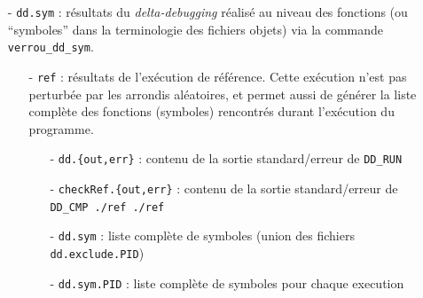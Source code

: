 \documentclass[a4paper]{article}
\begin{document}
\begin{itemize}
\item[- \tt dd.sym] : résultats du \textit{delta-debugging} réalisé
  au niveau des fonctions (ou ``symboles'' dans la terminologie des fichiers
  objets) via la commande \texttt{verrou\_dd\_sym}.
  \begin{itemize}
  \item[- \tt ref] : résultats de l'exécution de référence. Cette exécution
    n'est pas perturbée par les arrondis aléatoires, et permet aussi de générer
    la liste complète des fonctions (symboles) rencontrés durant l'exécution du
    programme.
    \begin{itemize}
    \item[- \tt dd.\{out,err\}] : contenu de la sortie standard/erreur de \texttt{DD\_RUN}
    \item[- \tt checkRef.\{out,err\}] : contenu de la sortie standard/erreur de \texttt{DD\_CMP ./ref ./ref}
    \item[- \tt dd.sym] : liste complète de symboles (union des fichiers \texttt{dd.exclude.PID})
    \item[- \tt dd.sym.PID] : liste complète de symboles pour chaque execution


\end{itemize}
\end{itemize}
\end{itemize}
\end{document}
